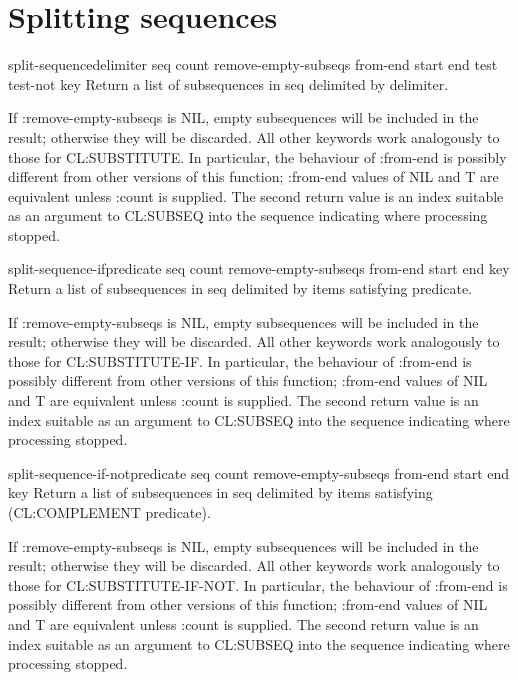 \documentclass[10pt,english]{book}
\begin{document}
\section{Splitting sequences}
\label{sec:splitting-sequences}

\begin{function}{split-sequence}{delimiter seq \key count
    remove-empty-subseqs from-end start end test test-not key}
  Return a list of subsequences in seq delimited by delimiter.

  If :remove-empty-subseqs is NIL, empty subsequences will be included
  in the result; otherwise they will be discarded.  All other keywords
  work analogously to those for CL:SUBSTITUTE.  In particular, the
  behaviour of :from-end is possibly different from other versions of
  this function; :from-end values of NIL and T are equivalent unless
  :count is supplied. The second return value is an index suitable as an
  argument to CL:SUBSEQ into the sequence indicating where processing
  stopped.
\end{function}

\begin{function}{split-sequence-if}{predicate seq \key count
    remove-empty-subseqs from-end start end key}
  Return a list of subsequences in seq delimited by items satisfying
  predicate.

  If :remove-empty-subseqs is NIL, empty subsequences will be included
  in the result; otherwise they will be discarded.  All other keywords
  work analogously to those for CL:SUBSTITUTE-IF.  In particular, the
  behaviour of :from-end is possibly different from other versions of
  this function; :from-end values of NIL and T are equivalent unless
  :count is supplied. The second return value is an index suitable as an
  argument to CL:SUBSEQ into the sequence indicating where processing
  stopped.  
\end{function}

\begin{function}{split-sequence-if-not}{predicate seq \key count
    remove-empty-subseqs from-end start end key}
  Return a list of subsequences in seq delimited by items satisfying
  (CL:COMPLEMENT predicate).

  If :remove-empty-subseqs is NIL, empty subsequences will be included
  in the result; otherwise they will be discarded. All other keywords
  work analogously to those for CL:SUBSTITUTE-IF-NOT. In particular,
  the behaviour of :from-end is possibly different from other versions
  of this function; :from-end values of NIL and T are equivalent
  unless :count is supplied. The second return value is an index
  suitable as an argument to CL:SUBSEQ into the sequence indicating
  where processing stopped.
\end{function}
\end{document}
